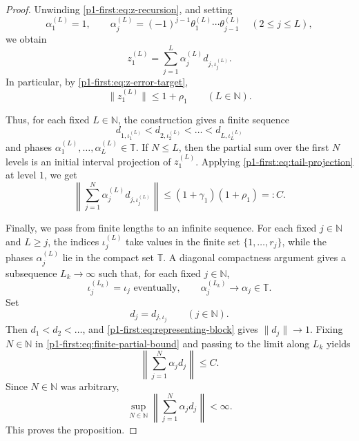 \documentclass[11pt,reqno]{amsart}
\makeatletter
\theoremstyle{plain}
\theoremstyle{definition}
\newcommand{\N}{\mathbb N}
\newcommand{\T}{\mathbb T}
\newcounter{problempaper}
\newenvironment{problempaperbody}{%
  \setcounter{subsection}{0}%
  \setcounter{subsubsection}{0}%
  \setcounter{paragraph}{0}%
  \renewcommand{\thesubsection}{\arabic{subsection}}%
  \renewcommand{\thesubsubsection}{\thesubsection.\arabic{subsubsection}}%
  \renewcommand{\theparagraph}{\thesubsubsection.\arabic{paragraph}}%
  \let\problem@outersection\section
  \let\problem@outersubsection\subsection
  \let\problem@outersubsubsection\subsubsection
  \let\problem@outerparagraph\paragraph
  \let\section\problem@papersection
  \let\subsection\problem@papersubsection
  \let\subsubsection\problem@papersubsubsection
}{%
  \let\section\problem@outersection
  \let\subsection\problem@outersubsection
  \let\subsubsection\problem@outersubsubsection
  \let\paragraph\problem@outerparagraph
}
\newcommand{\problem@target}[2]{%
  \hypertarget{problem-\theproblempaper-#1-#2}{}%
}
\newcommand{\problem@paperheading}[3]{%
  \par\bigskip
  \problem@target{#1}{#2}%
  \noindent{\large\bfseries #2.\quad #3\par}%
  \nobreak\smallskip
}
\newcommand{\problem@papersubheading}[3]{%
  \par\medskip
  \problem@target{#1}{#2}%
  \noindent{\normalsize\bfseries #2.\quad #3\par}%
  \nobreak\smallskip
}
\newcommand{\problem@papersubsubheading}[3]{%
  \par\smallskip
  \problem@target{#1}{#2}%
  \noindent{\normalsize\itshape #2.\quad #3.\ }%
}
\def\problem@papersection{%
  \@ifstar{\problem@papersectionstar}{\problem@papersectionnostar}%
}
\def\problem@papersectionstar#1{%
  \par\bigskip\noindent{\large\bfseries #1\par}\nobreak\smallskip
}
\def\problem@papersectionnostar#1{%
  \refstepcounter{subsection}%
  \setcounter{subsubsection}{0}%
  \setcounter{paragraph}{0}%
  \problem@paperheading{section}{\thesubsection}{#1}%
  \problem@writecontentsline{section}{\thesubsection}{#1}%
}
\def\problem@papersubsection{%
  \@ifstar{\problem@papersubsectionstar}{\problem@papersubsectionnostar}%
}
\def\problem@papersubsectionstar#1{%
  \par\medskip\noindent{\normalsize\bfseries #1\par}\nobreak\smallskip
}
\def\problem@papersubsectionnostar#1{%
  \refstepcounter{subsubsection}%
  \setcounter{paragraph}{0}%
  \problem@papersubheading{subsection}{\thesubsubsection}{#1}%
  \problem@writecontentsline{subsection}{\thesubsubsection}{#1}%
}
\def\problem@papersubsubsection{%
  \@ifstar{\problem@papersubsubsectionstar}{\problem@papersubsubsectionnostar}%
}
\def\problem@papersubsubsectionstar#1{%
  \par\smallskip\noindent{\normalsize\itshape #1.\ }%
}
\def\problem@papersubsubsectionnostar#1{%
  \refstepcounter{paragraph}%
  \problem@papersubsubheading{subsubsection}{\theparagraph}{#1}%
  \problem@writecontentsline{subsubsection}{\theparagraph}{#1}%
}
\newcommand{\problem@writecontentsline}[3]{%
  \begingroup
  \protected@write\@auxout{}{%
    \string\problemcontentsentry{\theproblempaper}{#1}{#2}{#3}{\thepage}%
  }%
  \endgroup
}
\newcommand{\problemcontentsentry}[5]{%
  \@ifundefined{problemcontents@#1}{%
    \expandafter\gdef\csname problemcontents@#1\endcsname{}%
  }{}%
  \expandafter\g@addto@macro\csname problemcontents@#1\endcsname{%
    \problemcontentsline{#1}{#2}{#3}{#4}{#5}%
  }%
}
\newcommand{\problemcontentslink}[4]{%
  \hyperlink{problem-#1-#2-#3}{#4}%
}
\newcommand{\problemcontentsline}[5]{%
  \ifstrequal{#2}{section}{%
    \par\noindent
    \problemcontentslink{#1}{#2}{#3}{\makebox[2.5em][l]{#3}#4}%
    \nobreak\dotfill
    \problemcontentslink{#1}{#2}{#3}{#5}\par
  }{%
    \ifstrequal{#2}{subsection}{%
      \par\noindent\hspace*{1.5em}%
      \problemcontentslink{#1}{#2}{#3}{\makebox[3.5em][l]{#3}#4}%
      \nobreak\dotfill
      \problemcontentslink{#1}{#2}{#3}{#5}\par
    }{%
      \par\noindent\hspace*{3em}%
      \problemcontentslink{#1}{#2}{#3}{\makebox[4.5em][l]{#3}#4}%
      \nobreak\dotfill
      \problemcontentslink{#1}{#2}{#3}{#5}\par
    }%
  }%
}
\makeatother
\begin{document}
\begin{problempaperbody}
\begin{proof}
Unwinding \eqref{p1-first:eq:z-recursion}, and setting
\begin{equation*}
        \alpha_1^{(L)}=1, \qquad \alpha_j^{(L)}=(-1)^{j-1}\theta_1^{(L)}\cdots\theta_{j-1}^{(L)} \quad(2\leq j\leq L),
\end{equation*}
we obtain
\begin{equation}
\label{p1-first:eq:finite-expansion}
        z_1^{(L)}=\sum_{j=1}^{L}\alpha_j^{(L)}d_{j,\iota_j^{(L)}}.
\end{equation}
In particular, by \eqref{p1-first:eq:z-error-target},
\begin{equation}
\label{p1-first:eq:z1-bound}
        \|z_1^{(L)}\|\leq 1+\rho_1 \qquad(L\in\N).
\end{equation}

Thus, for each fixed $L\in\N$, the construction gives a finite sequence
\begin{equation*}
        d_{1,\iota_1^{(L)}}<d_{2,\iota_2^{(L)}}<\ldots<d_{L,\iota_L^{(L)}}
\end{equation*}
and phases $\alpha_1^{(L)},\ldots,\alpha_L^{(L)}\in\T$. If $N\leq L$, then the partial sum over the first $N$ levels is an initial interval projection of $z_1^{(L)}$. Applying \eqref{p1-first:eq:tail-projection} at level $1$, we get
\begin{equation}
\label{p1-first:eq:finite-partial-bound}
        \left\|\sum_{j=1}^{N}\alpha_j^{(L)}d_{j,\iota_j^{(L)}}\right\|\leq (1+\gamma_1)(1+\rho_1)=:C.
\end{equation}


Finally, we pass from finite lengths to an infinite sequence. For each fixed $j\in\N$ and $L \geq j$, the indices $\iota_j^{(L)}$ take values in the finite set $\{1,\ldots,r_j\}$, while the phases $\alpha_j^{(L)}$ lie in the compact set $\T$. A diagonal compactness argument gives a subsequence $L_k\to\infty$ such that, for each fixed $j\in\N$,
\begin{equation*}
        \iota_j^{(L_k)}=\iota_j \text{ eventually},
        \qquad
        \alpha_j^{(L_k)}\to\alpha_j\in\T.
\end{equation*}
Set
\begin{equation*}
        d_j=d_{j,\iota_j}\qquad(j\in\N).
\end{equation*}
Then $d_1<d_2<\ldots$, and \eqref{p1-first:eq:representing-block} gives $\|d_j\|\to1$. Fixing $N\in\N$ in \eqref{p1-first:eq:finite-partial-bound} and passing to the limit along $L_k$ yields
\begin{equation*}
        \left\|\sum_{j=1}^{N}\alpha_jd_j\right\|\leq C.
\end{equation*}
Since $N\in\N$ was arbitrary,
\begin{equation*}
        \sup_{N\in\N}\left\|\sum_{j=1}^{N}\alpha_jd_j\right\|<\infty.
\end{equation*}
This proves the proposition.
\end{proof}




\end{problempaperbody}
\end{document}
